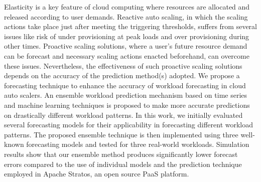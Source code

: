 Elasticity is a key feature of cloud computing where resources are allocated and released according to user demands. Reactive auto scaling, in which the scaling actions take place just after meeting the triggering thresholds, suffers from several issues like risk of under provisioning at peak loads and over provisioning during other times. Proactive scaling solutions, where a user's future resource demand can be forecast and necessary scaling actions enacted beforehand, can overcome these issues. Nevertheless, the effectiveness of such proactive scaling solutions depends on the accuracy of the prediction method(s) adopted. We propose a forecasting technique to enhance the accuracy of workload forecasting in cloud auto scalers. An ensemble workload prediction mechanism based on time series and machine learning techniques is proposed to make more accurate predictions on drastically different workload patterns. In this work, we initially evaluated several forecasting models for their applicability in forecasting different workload patterns. The proposed ensemble technique is then implemented using three well-known forecasting models and tested for three real-world workloads. Simulation results show that our ensemble method produces significantly lower forecast errors compared to the use of individual models and the prediction technique employed in Apache Stratos, an open source PaaS platform.